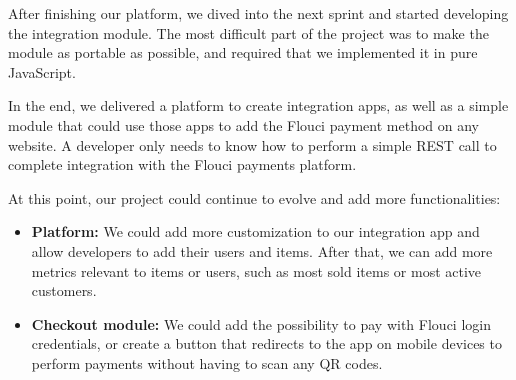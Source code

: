 \begin{spacing}{1.2}
After finishing our platform, we dived into the next sprint and started developing the integration module. The most difficult part of the project was to make the module as portable as possible, and required that we implemented it in pure JavaScript.  
\newline

In the end, we delivered a platform to create integration apps, as well as a simple module that could use those apps to add the Flouci payment method on any website. A developer only needs to know how to perform a simple REST call to complete integration with the Flouci payments platform.
\newline

At this point, our project could continue to evolve and add more functionalities:
\begin{itemize}
	\item \textbf{Platform:} We could add more customization to our integration app and allow developers to add their users and items. After that, we can add more metrics relevant to items or users, such as most sold items or most active customers.
	\item \textbf{Checkout module:} We could add the possibility to pay with Flouci login credentials, or create a button that redirects to the app on mobile devices to perform payments without having to scan any QR codes.
\end{itemize} 

\end{spacing}
